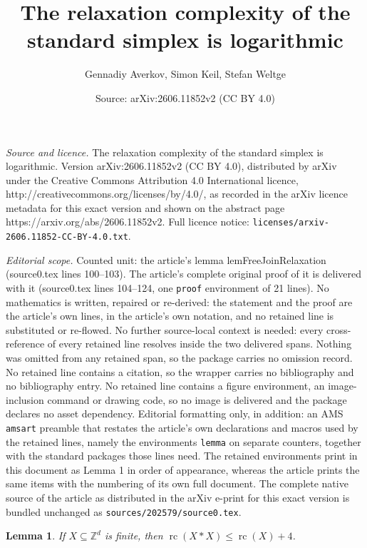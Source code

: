 \documentclass[10pt,a4paper]{amsart}
\title{The relaxation complexity of the standard simplex is logarithmic}
\author{Gennadiy Averkov, Simon Keil, Stefan Weltge}
\date{Source: arXiv:2606.11852v2 (CC BY 4.0)}
\newtheorem{lemma}{Lemma}
\newcommand{\Z}{\mathbb{Z}}
\newcommand{\rc}{\operatorname{rc}}
\begin{document}
\maketitle

\noindent\emph{Source and licence.} The relaxation complexity of the standard simplex is logarithmic. Version arXiv:2606.11852v2 (CC BY 4.0), distributed by arXiv under the Creative Commons Attribution 4.0 International licence, http://creativecommons.org/licenses/by/4.0/, as recorded in the arXiv licence metadata for this exact version and shown on the abstract page https://arxiv.org/abs/2606.11852v2. Full licence notice: \texttt{licenses/arxiv-2606.11852-CC-BY-4.0.txt}.\par\smallskip

\noindent\textit{Editorial scope.} Counted unit: the article's lemma lemFreeJoinRelaxation (source0.tex lines 100--103). The article's complete original proof of it is delivered with it (source0.tex lines 104--124, one \texttt{proof} environment of 21 lines). No mathematics is written, repaired or re-derived: the statement and the proof are the article's own lines, in the article's own notation, and no retained line is substituted or re-flowed.  No further source-local context is needed: every cross-reference of every retained line resolves inside the two delivered spans.  Nothing was omitted from any retained span, so the package carries no omission record.  No retained line contains a citation, so the wrapper carries no bibliography and no bibliography entry.  No retained line contains a figure environment, an image-inclusion command or drawing code, so no image is delivered and the package declares no asset dependency.  Editorial formatting only, in addition: an AMS \texttt{amsart} preamble that restates the article's own declarations and macros used by the retained lines, namely the environments \texttt{lemma} on separate counters, together with the standard packages those lines need.  The retained environments print in this document as Lemma 1 in order of appearance, whereas the article prints the same items with the numbering of its own full document.  The complete native source of the article as distributed in the arXiv e-print for this exact version is bundled unchanged as \texttt{sources/202579/source0.tex}.
\begin{lemma}
    \label{lemFreeJoinRelaxation}
    If $X \subseteq \Z^d$ is finite, then $\rc(X \ast X ) \le \rc(X) + 4$.
\end{lemma}
\end{document}
